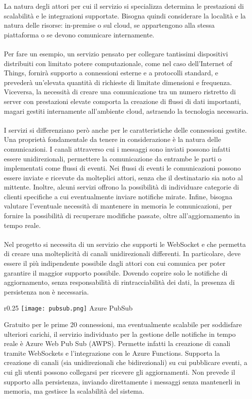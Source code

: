La natura degli attori per cui il servizio si specializza 
determina le prestazioni di scalabilità e le integrazioni supportate. 
Bisogna quindi considerare la località e la natura delle risorse: in-premise o sul cloud, 
se appartengono alla stessa piattaforma o se devono comunicare internamente.\\
\\
Per fare un esempio, 
un servizio pensato per collegare tantissimi dispositivi distribuiti
con limitato potere computazionale, 
come nel caso dell'Internet of Things,
fornirà  supporto a connessioni esterne e a protocolli standard, 
e prevederà un'elevata quantità di richieste di limitate dimensioni e frequenza. 
Viceversa,
la necessità di creare una comunicazione 
tra un numero ristretto di server con prestazioni elevate 
comporta la creazione di flussi di dati importanti, 
magari gestiti internamente all'ambiente cloud, astraendo la tecnologia necessaria.\\
\\
I servizi si differenziano però anche per le caratteristiche delle connessioni gestite.
Una proprietà fondamentale da tenere in considerazione è la natura delle comunicazioni. 
I canali attraverso cui i messaggi sono inviati 
possono infatti essere unidirezionali, 
permettere la comunicazione da entrambe le parti o implementati come flussi di eventi.
Nei flussi di eventi le comunicazioni possono essere inviate e ricevute da molteplici attori, 
senza che il destinatario sia noto al mittente. 
Inoltre, alcuni servizi offrono la possibilità di individuare
categorie di clienti specifiche 
a cui eventualmente inviare notifiche mirate. 
Infine,
bisogna valutare l'eventuale necessità di mantenere in memoria le comunicazioni, 
per fornire la possibilità di recuperare modifiche passate,
oltre all'aggiornamento in tempo reale.\\
\\
Nel progetto si necessita di un servizio che supporti le WebSocket 
e che permetta di creare una molteplicità di canali unidirezionali differenti. 
In particolare, deve essere il più indipendente possibile dagli attori 
con cui comunica per poter garantire il maggior supporto possibile. 
Dovendo coprire solo le notifiche di aggiornamento, 
senza responsabilità di rintracciabilità dei dati, 
la presenza di persistenza non è necessaria.\\
\begin{wrapfigure}{r}{0.25\textwidth}
    \centering
    \texttt{[image: pubsub.png]}
    Azure PubSub
\end{wrapfigure}
Gratuito per le prime 20 connessioni, 
ma eventualmente scalabile per soddisfare ulteriori carichi, 
il servizio individuato per la gestione delle notifiche in tempo reale
è Azure Web Pub Sub (AWPS). 
Permette infatti la creazione di canali tramite WebSockets e
l'integrazione con le Azure Functions. 
Supporta la creazione di canali (sia unidirezionali che bidirezionali) su cui pubblicare eventi, 
a cui gli utenti possono collegarsi per ricevere gli aggiornamenti. 
Non prevede il supporto alla persistenza, 
inviando direttamente i messaggi senza mantenerli in memoria,
ma gestisce la scalabilità del sistema.

